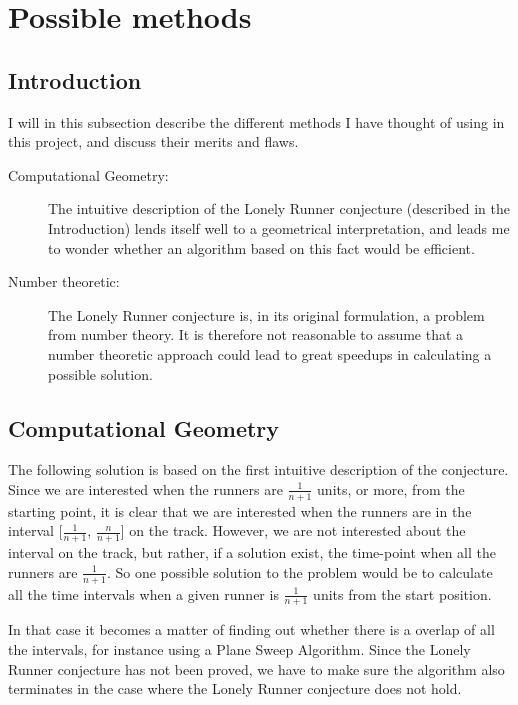 \section{Possible methods}
\label{choiceOfMethod}

\subsection{Introduction}
I will in this subsection describe the different methods I have thought of using in this project, and discuss their merits and flaws.

\begin{description}
\item[Computational Geometry:] The intuitive description of the Lonely Runner conjecture (described in the Introduction) lends itself well to a geometrical interpretation, and leads me to wonder whether an algorithm based on this fact would be efficient.

\item[Number theoretic:] The Lonely Runner conjecture is, in its original formulation, a problem from number theory. It is therefore not reasonable to assume that a number theoretic approach could lead to great speedups in calculating a possible solution.
\end{description}

\subsection{Computational Geometry}
The following solution is based on the first intuitive description of the conjecture. Since we are interested when the runners are $\frac{1}{n + 1}$ units, or more, from the starting point, it is clear that we are interested when the runners are in the interval [$\frac{1}{n + 1}$, $\frac{n}{n + 1}$] on the track. However, we are not interested about the interval on the track, but rather, if a solution exist, the time-point when all the runners are $\frac{1}{n+1}$. So one possible solution to the problem would be to calculate all the time intervals when a given runner is $\frac{1}{n+1}$ units from the start position. 

In that case it becomes a matter of finding out whether there is a overlap of all the intervals, for instance using a Plane Sweep Algorithm. Since the Lonely Runner conjecture has not been proved, we have to make sure the algorithm also terminates in the case where the Lonely Runner conjecture does not hold.




